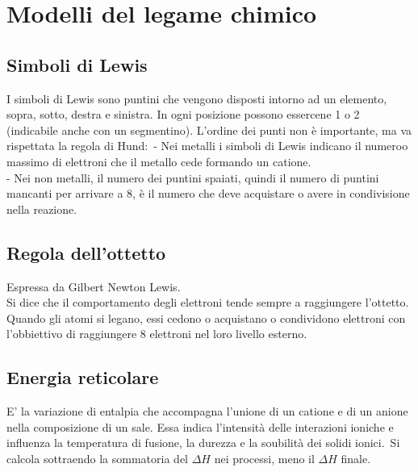\section{Modelli del legame chimico}
\subsection{Simboli di Lewis}
I simboli di Lewis sono puntini che vengono disposti intorno ad un elemento, sopra, sotto, destra e sinistra. In ogni posizione possono essercene 1 o 2 (indicabile anche con un segmentino). L'ordine dei punti non è importante, ma va rispettata la regola di Hund:\
\tab- Nei metalli i simboli di Lewis indicano il numeroo massimo di elettroni che il metallo cede formando un catione.\\
\tab- Nei non metalli, il numero dei puntini spaiati, quindi il numero di puntini mancanti per arrivare a 8, è il numero che deve acquistare o avere in condivisione nella reazione.
\subsection{Regola dell'ottetto}
Espressa da Gilbert Newton Lewis.\\
Si dice che il comportamento degli elettroni tende sempre a raggiungere l'ottetto. Quando gli atomi si legano, essi cedono o acquistano o condividono elettroni con l'obbiettivo di raggiungere 8 elettroni nel loro livello esterno.
\subsection{Energia reticolare}
E' la variazione di entalpia che accompagna l'unione di un catione e di un anione nella composizione di un sale. Essa indica l'intensità delle interazioni ioniche e influenza la temperatura di fusione, la durezza e la soubilità dei solidi ionici.\ Si calcola sottraendo la sommatoria del $\Delta H$ nei processi, meno il $\Delta H$ finale.
